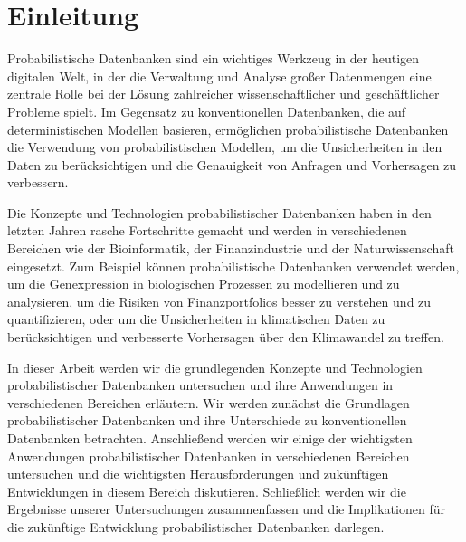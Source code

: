 \chapter{Einleitung}
Probabilistische Datenbanken sind ein wichtiges Werkzeug in der heutigen digitalen Welt, in der die Verwaltung und Analyse großer Datenmengen eine zentrale Rolle bei der Lösung zahlreicher wissenschaftlicher und geschäftlicher Probleme spielt. Im Gegensatz zu konventionellen Datenbanken, die auf deterministischen Modellen basieren, ermöglichen probabilistische Datenbanken die Verwendung von probabilistischen Modellen, um die Unsicherheiten in den Daten zu berücksichtigen und die Genauigkeit von Anfragen und Vorhersagen zu verbessern.
\vspace{1cm}


Die Konzepte und Technologien probabilistischer Datenbanken haben in den letzten Jahren rasche Fortschritte gemacht und werden in verschiedenen Bereichen wie der Bioinformatik, der Finanzindustrie und der Naturwissenschaft eingesetzt. Zum Beispiel können probabilistische Datenbanken verwendet werden, um die Genexpression in biologischen Prozessen zu modellieren und zu analysieren, um die Risiken von Finanzportfolios besser zu verstehen und zu quantifizieren, oder um die Unsicherheiten in klimatischen Daten zu berücksichtigen und verbesserte Vorhersagen über den Klimawandel zu treffen.
\vspace{1cm}

In dieser Arbeit werden wir die grundlegenden Konzepte und Technologien probabilistischer Datenbanken untersuchen und ihre Anwendungen in verschiedenen Bereichen erläutern. Wir werden zunächst die Grundlagen probabilistischer Datenbanken und ihre Unterschiede zu konventionellen Datenbanken betrachten. Anschließend werden wir einige der wichtigsten Anwendungen probabilistischer Datenbanken in verschiedenen Bereichen untersuchen und die wichtigsten Herausforderungen und zukünftigen Entwicklungen in diesem Bereich diskutieren. Schließlich werden wir die Ergebnisse unserer Untersuchungen zusammenfassen und die Implikationen für die zukünftige Entwicklung probabilistischer Datenbanken darlegen.